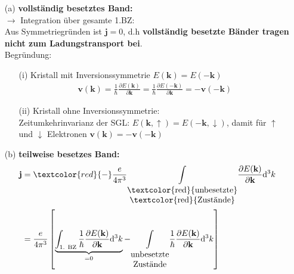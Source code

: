 \begin{itemize}
    \item[(a)] \textbf{vollständig besetztes Band:} \\
        $\rightarrow$ Integration über gesamte 1.BZ: \\
        Aus Symmetriegründen ist $\textbf{j} = 0$, d.h \textbf{vollständig besetzte Bänder tragen nicht zum Ladungstransport bei}. \\
        Begründung:
        \begin{itemize}
            \item[(i)] Kristall mit Inversionssymmetrie $E(\textbf{k}) = E(- \textbf{k})$ \\
                \begin{align}
                    \textbf{v}(\textbf{k}) = \frac{1}{\hbar} \frac{\partial E(\textbf{k})}{\partial \textbf{k}} = \frac{1}{\hbar} \frac{\partial E(-\textbf{k})}{\partial \textbf{k}} = - \textbf{v}(-\textbf{k})
                \end{align}
            \item[(ii)] Kristall ohne Inversionssymmetrie:\\
            Zeitumkehrinvarianz der SGL: $E(\textbf{k},\uparrow) = E(-\textbf{k},\downarrow) $, damit für $\uparrow$ und $\downarrow$ Elektronen $\textbf{v}(\textbf{k}) = - \textbf{v}(-\textbf{k})$
        \end{itemize}
    \item[(b)] \textbf{teilweise besetzes Band:}
        \begin{align}
            \textbf{j} &= \textcolor{red}{-} \frac{e}{4\pi^3} \underset{\begin{matrix}
                \text{\textcolor{red}{unbesetzte}}\\
                \text{\textcolor{red}{Zustände}}
            \end{matrix}}{\int} \frac{\partial E(\textbf{k}) }{\partial \textbf{k}} \mathrm{d}^3 k\\
             &= \frac{e}{4\pi^3} \left[    \underbrace{\int_\text{1. BZ} \frac{1}{\hbar} \frac{\partial E(\textbf{k}) }{\partial \textbf{k}} \mathrm{d}^3 k }_{=0}   -  \underset{\begin{matrix}
                \text{unbesetzte}\\
                \text{Zustände}
            \end{matrix}}{\int} \frac{1}{\hbar} \frac{\partial E(\textbf{k}) }{\partial \textbf{k}} \mathrm{d}^3 k \right] \\

\end{align}
\end{itemize}
